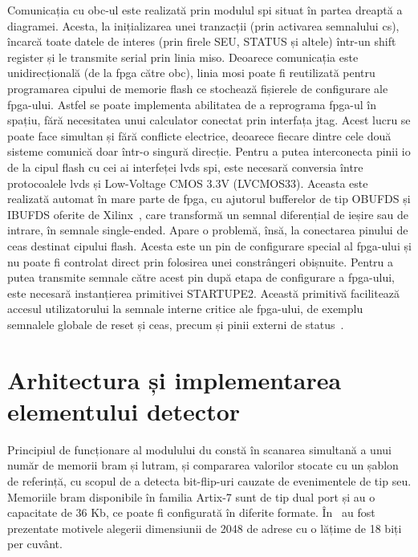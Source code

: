 \documentclass[12pt,a4paper]{report}
\begin{document}
Comunicația cu \gls{obc}-ul este realizată prin modulul \gls{spi} situat în partea dreaptă a diagramei. Acesta, la inițializarea unei tranzacții (prin activarea semnalului \gls{cs}), încarcă toate datele de interes (prin firele SEU, STATUS și altele) într-un shift register și le transmite serial prin linia \gls{miso}. Deoarece comunicația este unidirecțională (de la \gls{fpga} către \gls{obc}), linia \gls{mosi} poate fi reutilizată pentru programarea cipului de memorie flash ce stochează fișierele de configurare ale \gls{fpga}-ului. Astfel se poate implementa abilitatea de a reprograma \gls{fpga}-ul în spațiu, fără necesitatea unui calculator conectat prin interfața \gls{jtag}. Acest lucru se poate face simultan și fără conflicte electrice, deoarece fiecare dintre cele două sisteme comunică doar într-o singură direcție. Pentru a putea interconecta pinii \gls{io} de la cipul flash cu cei ai interfeței \gls{lvds} \gls{spi}, este necesară conversia între protocoalele \gls{lvds} și Low-Voltage CMOS 3.3V (LVCMOS33). Aceasta este realizată automat în mare parte de \gls{fpga}, cu ajutorul bufferelor de tip OBUFDS și IBUFDS oferite de Xilinx~\cite{7series_select_io}, care transformă un semnal diferențial de ieșire sau de intrare, în semnale single-ended. Apare o problemă, însă, la conectarea pinului de ceas destinat cipului flash. Acesta este un pin de configurare special al \gls{fpga}-ului și nu poate fi controlat direct prin folosirea unei constrângeri obișnuite. Pentru a putea transmite semnale către acest pin după etapa de configurare a \gls{fpga}-ului, este necesară instanțierea primitivei STARTUPE2. Această primitivă facilitează accesul utilizatorului la semnale interne critice ale \gls{fpga}-ului, de exemplu semnalele globale de reset și ceas, precum și pinii externi de status~\cite{ug953}.

\section{Arhitectura și implementarea elementului detector}%
\label{seu_program_implementation}

Principiul de funcționare al modulului \acrfull{du} constă în scanarea simultană a unui număr de memorii \gls{bram} și \gls{lutram}, și compararea valorilor stocate cu un șablon de referință, cu scopul de a detecta bit-flip-uri cauzate de evenimentele de tip \gls{seu}. Memoriile \gls{bram} disponibile în familia Artix-7 sunt de tip dual port și au o capacitate de 36 Kb, ce poate fi configurată în diferite formate. În~\cite{isetc} au fost prezentate motivele alegerii dimensiunii de 2048 de adrese cu o lățime de 18 biți per cuvânt. 
\end{document}
